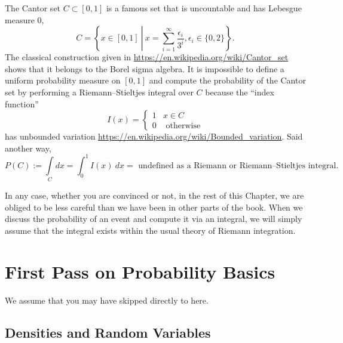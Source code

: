 The Cantor set $C \subset [0, 1]$ is a famous set that is uncountable and has Lebesgue measure $0$, 
$$C= \left\{ x \in [0, 1] ~\left|~ x= \sum_{i=1}^\infty  \frac{\epsilon_i}{3^i}, \epsilon_i \in \{0, 2\} \right.  \right\}.$$
The classical construction given in \url{https://en.wikipedia.org/wiki/Cantor_set} shows that it belongs to the Borel sigma algebra. 
It is impossible to define a uniform probability measure on $[0,1]$ and compute the probability of the Cantor set by performing a Riemann–Stieltjes integral over $C$ because the ``index function'' 
$$ I(x) =  \begin{cases}    1 &  x \in C \\ 0 & \text{ otherwise} \end{cases} $$
has unbounded variation \url{https://en.wikipedia.org/wiki/Bounded_variation}. Said another way, 
$$ P(C) := \underset{ C }{\int}  dx= \int_{0}^{1} I(x)~ dx = \text{ undefined as a Riemann or Riemann–Stieltjes integral}.$$

In any case, whether you are convinced or not, in the rest of this Chapter, we are obliged to be less careful than we have been in other parts of the book. When we discuss the probability of an event and compute it via an integral, we will simply assume that the integral exists within the usual theory of Riemann integration.

\section{First Pass on Probability Basics}
We assume that you may have skipped directly to here.

\subsection{Densities and Random Variables}

